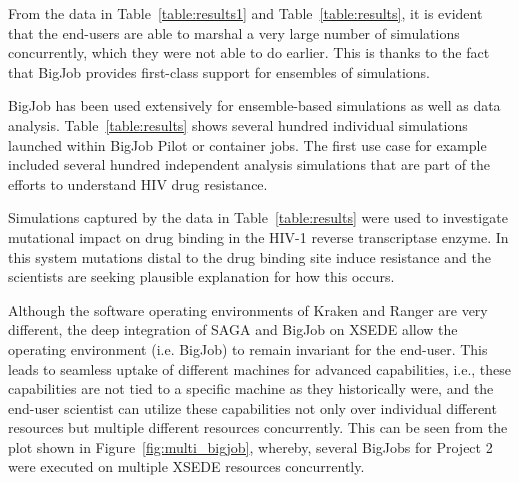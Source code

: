 \documentclass{sig-alternate}
\begin{document}
From the data in Table~\ref{table:results1} and
Table~\ref{table:results}, it is evident that the end-users are able
to marshal a very large number of simulations concurrently, which
they were not able to do earlier. This is thanks to the fact that
BigJob provides first-class support for ensembles of simulations.

BigJob has been used extensively for ensemble-based simulations as well as data
analysis. Table~\ref{table:results} shows several hundred individual simulations
launched within BigJob Pilot or container jobs. The first use case for example
included several hundred independent analysis simulations that are part of the
efforts to understand HIV drug resistance.

Simulations captured by the data in Table~\ref{table:results} were
used to investigate mutational impact on drug binding in the HIV-1
reverse transcriptase enzyme. In this system mutations distal to the
drug binding site induce resistance and the scientists are seeking
plausible explanation for how this occurs.

Although the software operating environments of Kraken and Ranger are
very different, the deep integration of SAGA and BigJob on
XSEDE allow the operating environment (i.e. BigJob) to remain
invariant for the end-user. 
This leads to seamless uptake of different machines for
advanced capabilities, i.e., these capabilities are not tied to a
specific machine as they historically were, and the end-user scientist can
utilize these capabilities not only over individual different
resources but multiple different resources concurrently. This can be
seen from the plot shown in Figure~\ref{fig:multi_bigjob}, whereby,
several BigJobs for Project 2 were executed on multiple XSEDE resources
concurrently.
\end{document}
